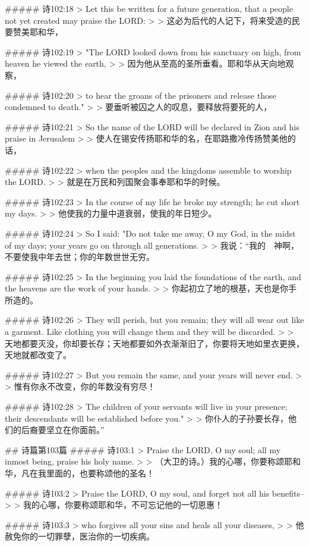 ##### 诗102:18
> Let this be written for a future generation, that a people not yet created may praise the LORD:
>
> 这必为后代的人记下，将来受造的民要赞美耶和华，


##### 诗102:19
> "The LORD looked down from his sanctuary on high, from heaven he viewed the earth,
>
> 因为他从至高的圣所垂看。耶和华从天向地观察，


##### 诗102:20
> to hear the groans of the prisoners and release those condemned to death."
>
> 要垂听被囚之人的叹息，要释放将要死的人，


##### 诗102:21
> So the name of the LORD will be declared in Zion and his praise in Jerusalem
>
> 使人在锡安传扬耶和华的名，在耶路撒冷传扬赞美他的话，


##### 诗102:22
> when the peoples and the kingdoms assemble to worship the LORD.
>
> 就是在万民和列国聚会事奉耶和华的时候。


##### 诗102:23
> In the course of my life he broke my strength; he cut short my days.
>
> 他使我的力量中道衰弱，使我的年日短少。


##### 诗102:24
> So I said: "Do not take me away, O my God, in the midst of my days; your years go on through all generations.
>
> 我说：“我的　神啊，不要使我中年去世；你的年数世世无穷。


##### 诗102:25
> In the beginning you laid the foundations of the earth, and the heavens are the work of your hands.
>
> 你起初立了地的根基，天也是你手所造的。


##### 诗102:26
> They will perish, but you remain; they will all wear out like a garment. Like clothing you will change them and they will be discarded.
>
> 天地都要灭没，你却要长存；天地都要如外衣渐渐旧了，你要将天地如里衣更换，天地就都改变了。


##### 诗102:27
> But you remain the same, and your years will never end.
>
> 惟有你永不改变，你的年数没有穷尽！


##### 诗102:28
> The children of your servants will live in your presence; their descendants will be established before you."
>
> 你仆人的子孙要长存，他们的后裔要坚立在你面前。”


## 诗篇第103篇
##### 诗103:1
> Praise the LORD, O my soul; all my inmost being, praise his holy name.
>
> （大卫的诗。）我的心哪，你要称颂耶和华，凡在我里面的，也要称颂他的圣名！


##### 诗103:2
> Praise the LORD, O my soul, and forget not all his benefits--
>
> 我的心哪，你要称颂耶和华，不可忘记他的一切恩惠！


##### 诗103:3
> who forgives all your sins and heals all your diseases,
>
> 他赦免你的一切罪孽，医治你的一切疾病。


